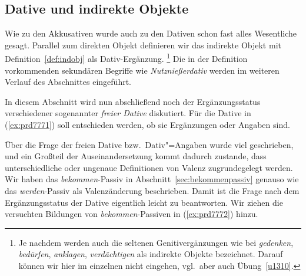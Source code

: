 \subsection{Dative und indirekte Objekte}

\label{sec:dativobjekte}

Wie zu den Akkusativen wurde auch zu den Dativen schon fast alles Wesentliche gesagt.
Parallel zum direkten Objekt definieren wir das indirekte Objekt mit Definition~\ref{def:indobj} als Dativ-Ergänzung.%
\footnote{Je nachdem werden auch die seltenen Genitivergänzungen wie bei \textit{gedenken}, \textit{bedürfen}, \textit{anklagen}, \textit{verdächtigen} als indirekte Objekte bezeichnet.
Darauf können wir hier im einzelnen nicht eingehen, vgl.\ aber auch Übung~\ref{u1310}.}
Die in der Definition vorkommenden sekundären Begriffe wie \textit{Nutznießerdativ} werden im weiteren Verlauf des Abschnittes eingeführt.


In diesem Abschnitt wird nun abschließend noch der Ergänzungsstatus verschiedener sogenannter \textit{freier Dative} diskutiert.
Für die Dative in (\ref{ex:prd7771}) soll entschieden werden, ob sie Ergänzungen oder Angaben sind.

\begin{exe}
  \ex\label{ex:prd7771} 
  \begin{xlist}
  \end{xlist}
\end{exe}


Über die Frage der freien Dative bzw.\ Dativ"=Angaben wurde viel geschrieben, und ein Großteil der Auseinandersetzung kommt dadurch zustande, dass unterschiedliche oder ungenaue Definitionen von Valenz zugrundegelegt werden.
Wir haben das \textit{bekommen}-Passiv in Abschnitt~\ref{sec:bekommenpassiv} genauso wie das \textit{werden}-Passiv als Valenzänderung beschrieben.
Damit ist die Frage nach dem Ergänzungsstatus der Dative eigentlich leicht zu beantworten.
Wir ziehen die versuchten Bildungen von \textit{bekommen}-Passiven in (\ref{ex:prd7772}) hinzu.

